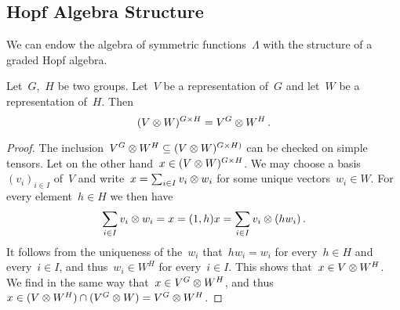 \documentclass[a4paper,11pt]{scrartcl}
\begin{document}
\subsection{Hopf Algebra Structure}

We can endow the algebra of symmetric functions~$\Lambda$ with the structure of a graded Hopf algebra.

\begin{lemma}
  Let~$G$,~$H$ be two groups.
  Let~$V$ be a representation of~$G$ and let~$W$ be a representation of~$H$.
  Then
  \[
    (V \otimes W)^{G \times H}
    =
    V^G \otimes W^H \,.
  \]
\end{lemma}

\begin{proof}
  The inclusion~$V^G \otimes W^H \subseteq (V \otimes W)^{G \times H)}$ can be checked on simple tensors.
  Let on the other hand~$x \in (V \otimes W)^{G \times H}$.
  We may choose a basis~$(v_i)_{i \in I}$ of~$V$ and write~$x = \sum_{i \in I} v_i \otimes w_i$ for some unique vectors~$w_i \in W$.
  For every element~$h \in H$ we then have
  \[
    \sum_{i \in I} v_i \otimes w_i
    =
    x
    =
    (1,h) x
    =
    \sum_{i \in I} v_i \otimes (h w_i) \,.
  \]
  It follows from the uniqueness of the~$w_i$ that~$h w_i = w_i$ for every~$h \in H$ and every~$i \in I$, and thus~$w_i \in W^H$ for every~$i \in I$.
  This shows that~$x \in V \otimes W^H$.
  We find in the same way that~$x \in V^G \otimes W^H$, and thus~$x \in (V \otimes W^H) \cap (V^G \otimes W) = V^G \otimes W^H$.
\end{proof}
\end{document}
